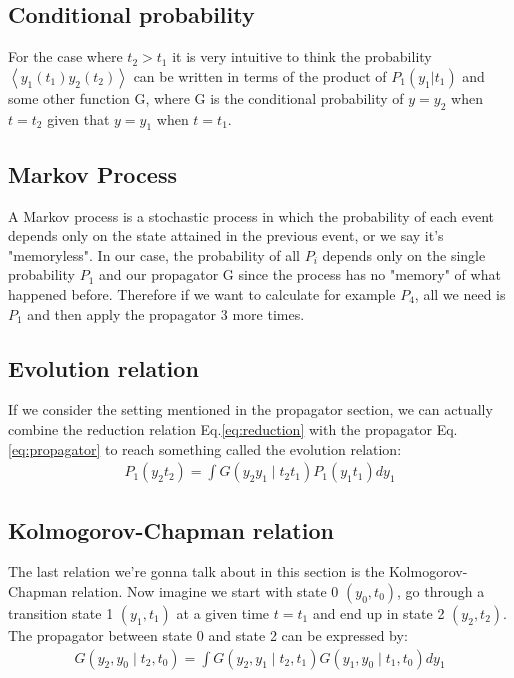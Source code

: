 \documentclass{report}
\begin{document}
\subsection{Conditional probability}
For the case where $t_2>t_1$ it is very intuitive to think the probability $\left\langle y_1\left(t_1\right) y_2\left(t_2\right)\right\rangle$ can be written in terms of the product of $P_1(y_1|t_1)$ and some other function G, where G is the conditional probability of $y=y_2$ when $t=t_2$ given that $y=y_1$ when $t=t_1$.
\subsection{Markov Process}
A Markov process is a stochastic process in which the probability of each event depends only on the state attained in the previous event, or we say it's "memoryless". In our case, the probability of all $P_i$ depends only on the single probability $P_1$ and our propagator G since the process has no "memory" of what happened before. Therefore if we want to calculate for example $P_4$, all we need is $P_1$ and then apply the propagator 3 more times.
\subsection{Evolution relation}
If we consider the setting mentioned in the propagator section, we can actually combine the reduction relation Eq.\eqref{eq:reduction} with the propagator Eq.\eqref{eq:propagator} to reach something called the evolution relation:
\begin{align}
    P_1\left(y_2 t_2\right)=\int G\left(y_2 y_1 \mid t_2 t_1\right) P_1\left(y_1 t_1\right) dy_1 \label{eq:evolution_relation}
\end{align}
\subsection{Kolmogorov-Chapman relation}
The last relation we're gonna talk about in this section is the Kolmogorov-Chapman relation. Now imagine we start with state 0 $(y_0,t_0)$, go through a transition state 1 $(y_1,t_1)$ at a given time $t=t_1$ and end up in state 2 $(y_2,t_2)$. The propagator between state 0 and state 2 can be expressed by:
\begin{align}
    G\left(y_2, y_0 \mid t_2, t_0\right)=\int G\left(y_2, y_1\mid t_2, t_1\right) G\left(y_1, y_0 \mid t_1, t_0\right) dy_1\label{eq:kolmogorov_relation}
\end{align}
\end{document}
